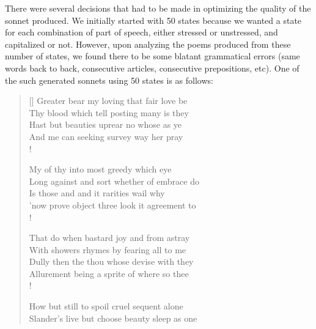 \documentclass[11pt]{article}
\begin{document}
\noindent There were several decisions that had to be made in optimizing the quality of the sonnet produced. We initially started with 50 states because we wanted a state for each combination of part of speech, either stressed or unstressed, and capitalized or not. However, upon analyzing the poems produced from these number of states, we found there to be some blatant grammatical errors (same words back to back, consecutive articles, consecutive prepositions, etc). One of the such generated sonnets using 50 states is as follows:
\newpage
\settowidth{\versewidth}{Long against and sort whether of embrace do}
\begin{verse}[\versewidth]
Greater bear my loving that fair love be \\
Thy blood which tell posting many is they \\
Hast but beauties uprear no whose as ye \\
And me can seeking survey way her pray \\!

My of thy into most greedy which eye \\
Long against and sort whether of embrace do \\
Is those and and it rarities wail why \\
'now prove object three look it agreement to \\!

That do when bastard joy and from astray \\
With showers rhymes by fearing all to me \\
Dully then the thou whose devise with they \\
Allurement being a sprite of where so thee \\!

How but still to spoil cruel sequent alone \\
Slander's live but choose beauty sleep as one \\
\end{verse}
\end{document}
